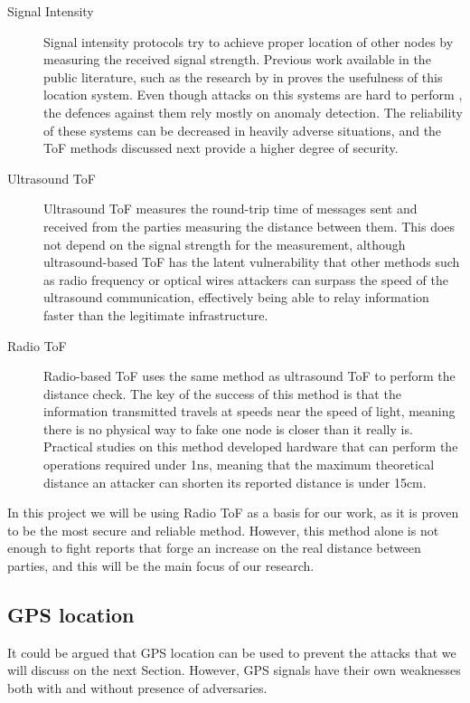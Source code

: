 \documentclass{article}
\begin{document}
\begin{description}
  \item[Signal Intensity] Signal intensity protocols try to achieve proper location of other nodes by measuring the received signal strength. Previous work available in the public literature, such as the research by \citeauthor{seshadri2005bayesian} in \cite{seshadri2005bayesian} proves the usefulness of this location system. Even though attacks on this systems are hard to perform \cite{sheng2008detecting}, the defences against them rely mostly on anomaly detection. The reliability of these systems can be decreased in heavily adverse situations, and the ToF methods discussed next provide a higher degree of security.
  \item[Ultrasound ToF] Ultrasound ToF measures the round-trip time of messages sent and received from the parties measuring the distance between them. This does not depend on the signal strength for the measurement, although ultrasound-based ToF has the latent vulnerability that other methods such as radio frequency or optical wires attackers can surpass the speed of the ultrasound communication, effectively being able to relay information faster than the legitimate infrastructure.
  \item[Radio ToF] Radio-based ToF uses the same method as ultrasound ToF to perform the distance check. The key of the success of this method is that the information transmitted travels at speeds near the speed of light, meaning there is no physical way to fake one node is closer than it really is. Practical studies on this method \cite{rasmussen2010realization} developed hardware that can perform the operations required under 1ns, meaning that the maximum theoretical distance an attacker can shorten its reported distance is under 15cm.
\end{description}

In this project we will be using Radio ToF as a basis for our work, as it is proven to be the most secure and reliable method. However, this method alone is not enough to fight reports that forge an increase on the real distance between parties, and this will be the main focus of our research.

\subsection{GPS location}

It could be argued that GPS location can be used to prevent the attacks that we will discuss on the next Section. However, GPS signals have their own weaknesses both with and without presence of adversaries.
\end{document}

